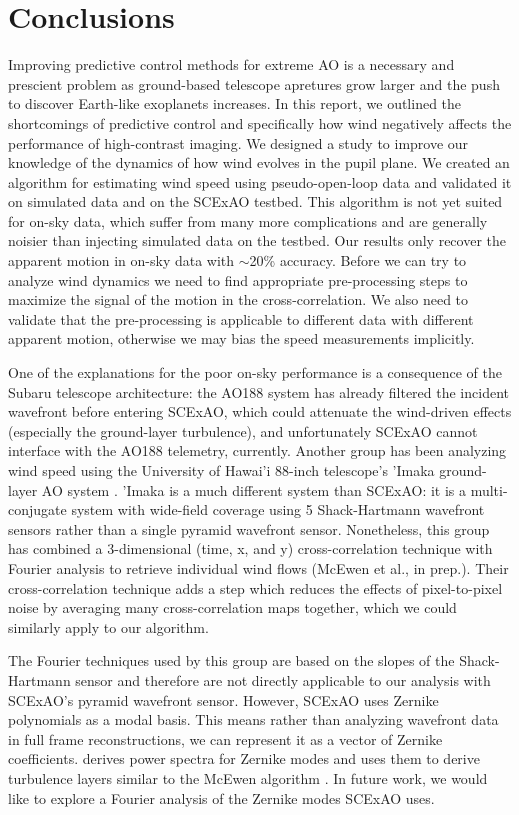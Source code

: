 \section{Conclusions}\label{sec:conclusions}

Improving predictive control methods for extreme AO is a necessary and prescient problem as ground-based telescope apretures grow larger and the push to discover Earth-like exoplanets increases. In this report, we outlined the shortcomings of predictive control and specifically how wind negatively affects the performance of high-contrast imaging. We designed a study to improve our knowledge of the dynamics of how wind evolves in the pupil plane. We created an algorithm for estimating wind speed using pseudo-open-loop data and validated it on simulated data and on the SCExAO testbed. This algorithm is not yet suited for on-sky data, which suffer from many more complications and are generally noisier than injecting simulated data on the testbed. Our results only recover the apparent motion in on-sky data with $\sim$20\% accuracy. Before we can try to analyze wind dynamics we need to find appropriate pre-processing steps to maximize the signal of the motion in the cross-correlation. We also need to validate that the pre-processing is applicable to different data with different apparent motion, otherwise we may bias the speed measurements implicitly.

One of the explanations for the poor on-sky performance is a consequence of the Subaru telescope architecture: the AO188 system has already filtered the incident wavefront before entering SCExAO, which could attenuate the wind-driven effects (especially the ground-layer turbulence), and unfortunately SCExAO cannot interface with the AO188 telemetry, currently. Another group has been analyzing wind speed using the University of Hawai'i 88-inch telescope's 'Imaka ground-layer AO system \citep{2016SPIE.9909E..02C}. 'Imaka is a much different system than SCExAO: it is a multi-conjugate system with wide-field coverage using 5 Shack-Hartmann wavefront sensors rather than a single pyramid wavefront sensor. Nonetheless, this group has combined a 3-dimensional (time, x, and y) cross-correlation technique with Fourier analysis to retrieve individual wind flows (McEwen et al., in prep.). Their cross-correlation technique adds a step which reduces the effects of pixel-to-pixel noise by averaging many cross-correlation maps together, which we could similarly apply to our algorithm.

The Fourier techniques used by this group are based on the slopes of the Shack-Hartmann sensor and therefore are not directly applicable to our analysis with SCExAO's pyramid wavefront sensor. However, SCExAO uses Zernike polynomials as a modal basis. This means rather than analyzing wavefront data in full frame reconstructions, we can represent it as a vector of Zernike coefficients. \citet{1993JOSAA..10..957R} derives power spectra for Zernike modes and uses them to derive turbulence layers similar to the McEwen algorithm \citep[see][fig.~14]{1993JOSAA..10..957R}. In future work, we would like to explore a Fourier analysis of the Zernike modes SCExAO uses.